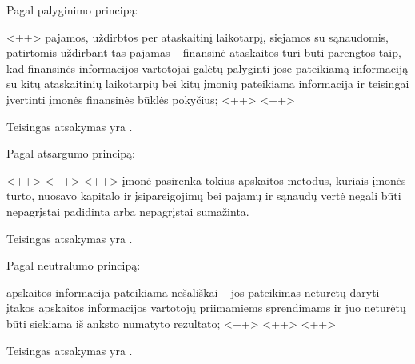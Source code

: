 \begin{tasks}
  \begin{task}
    \begin{condition}
      Pagal palyginimo principą:
      \begin{enumerate}
         <++>
         pajamos, uždirbtos per ataskaitinį laikotarpį,
          siejamos su sąnaudomis, patirtomis uždirbant tas pajamas –
          finansinė ataskaitos turi būti parengtos taip, kad finansinės
          informacijos vartotojai galėtų palyginti jose pateikiamą
          informaciją su kitų ataskaitinių laikotarpių bei kitų
          įmonių pateikiama informacija ir teisingai įvertinti
          įmonės finansinės būklės pokyčius;
         <++>
         <++>
      \end{enumerate}
    \end{condition}
    \begin{solution}
      Teisingas atsakymas yra .
    \end{solution}
  \end{task}

  \begin{task}
    \begin{condition}
      Pagal atsargumo principą:
      \begin{enumerate}
         <++>
         <++>
         <++>
         įmonė pasirenka tokius apskaitos metodus, kuriais
          įmonės turto, nuosavo kapitalo ir įsipareigojimų bei
          pajamų ir sąnaudų vertė negali būti nepagrįstai padidinta
          arba nepagrįstai sumažinta.
      \end{enumerate}
    \end{condition}
    \begin{solution}
      Teisingas atsakymas yra .
    \end{solution}
  \end{task}

  \begin{task}
    \begin{condition}
      Pagal neutralumo principą:
      \begin{enumerate}
         apskaitos informacija pateikiama nešališkai – jos
          pateikimas neturėtų daryti įtakos apskaitos informacijos
          vartotojų priimamiems sprendimams ir juo neturėtų būti
          siekiama iš anksto numatyto rezultato;
         <++>
         <++>
         <++>
      \end{enumerate}
    \end{condition}
    \begin{solution}
      Teisingas atsakymas yra .
    \end{solution}
  \end{task}


\end{tasks}
